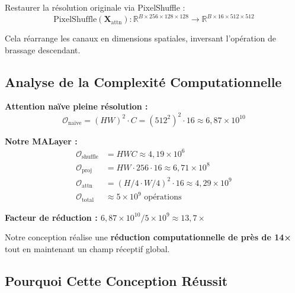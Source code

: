 \documentclass[conference]{IEEEtran}
\begin{document}
Restaurer la résolution originale via PixelShuffle :
\begin{equation}
\text{PixelShuffle}(\mathbf{X}_{\text{attn}}) : \mathbb{R}^{B \times 256 \times 128 \times 128} \rightarrow \mathbb{R}^{B \times 16 \times 512 \times 512}
\end{equation}

Cela réarrange les canaux en dimensions spatiales, inversant l'opération de brassage descendant.

\subsection{Analyse de la Complexité Computationnelle}

\textbf{Attention naïve pleine résolution :}
\begin{equation}
\mathcal{O}_{\text{naïve}} = (HW)^2 \cdot C = (512^2)^2 \cdot 16 \approx 6,87 \times 10^{10}
\end{equation}

\textbf{Notre MALayer :}
\begin{align}
\mathcal{O}_{\text{shuffle}} &= HWC \approx 4,19 \times 10^6 \\
\mathcal{O}_{\text{proj}} &= HW \cdot 256 \cdot 16 \approx 6,71 \times 10^8 \\
\mathcal{O}_{\text{attn}} &= (H/4 \cdot W/4)^2 \cdot 16 \approx 4,29 \times 10^9 \\
\mathcal{O}_{\text{total}} &\approx 5 \times 10^9 \text{ opérations}
\end{align}

\textbf{Facteur de réduction : $6,87 \times 10^{10} / 5 \times 10^9 \approx 13,7\times$}

Notre conception réalise une \textbf{réduction computationnelle de près de 14×} tout en maintenant un champ réceptif global.

\subsection{Pourquoi Cette Conception Réussit}
\end{document}
